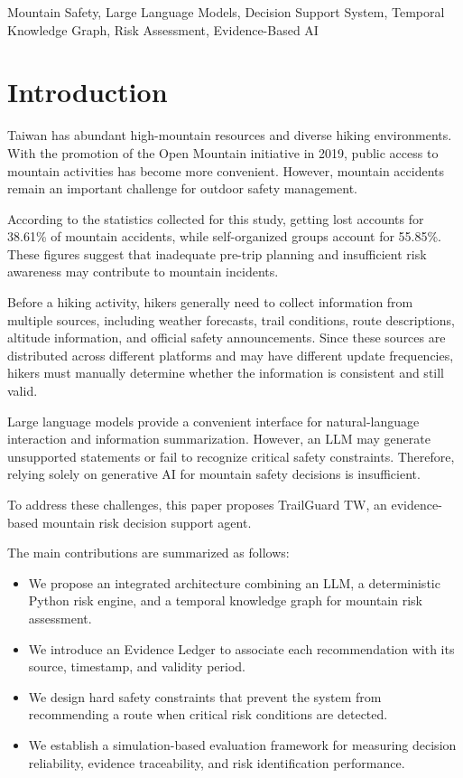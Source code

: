 \documentclass[conference]{IEEEtran}
\begin{document}
\begin{IEEEkeywords}
Mountain Safety, Large Language Models, Decision Support System,
Temporal Knowledge Graph, Risk Assessment, Evidence-Based AI
\end{IEEEkeywords}

\section{Introduction}

Taiwan has abundant high-mountain resources and diverse hiking
environments. With the promotion of the Open Mountain initiative
in 2019, public access to mountain activities has become more
convenient. However, mountain accidents remain an important
challenge for outdoor safety management.

According to the statistics collected for this study, getting lost
accounts for 38.61\% of mountain accidents, while self-organized
groups account for 55.85\%. These figures suggest that inadequate
pre-trip planning and insufficient risk awareness may contribute
to mountain incidents.

Before a hiking activity, hikers generally need to collect
information from multiple sources, including weather forecasts,
trail conditions, route descriptions, altitude information,
and official safety announcements. Since these sources are
distributed across different platforms and may have different
update frequencies, hikers must manually determine whether the
information is consistent and still valid.

Large language models provide a convenient interface for
natural-language interaction and information summarization.
However, an LLM may generate unsupported statements or fail to
recognize critical safety constraints. Therefore, relying solely
on generative AI for mountain safety decisions is insufficient.

To address these challenges, this paper proposes TrailGuard TW,
an evidence-based mountain risk decision support agent.

The main contributions are summarized as follows:

\begin{itemize}
    \item We propose an integrated architecture combining an LLM,
    a deterministic Python risk engine, and a temporal knowledge
    graph for mountain risk assessment.

    \item We introduce an Evidence Ledger to associate each
    recommendation with its source, timestamp, and validity period.

    \item We design hard safety constraints that prevent the
    system from recommending a route when critical risk conditions
    are detected.

    \item We establish a simulation-based evaluation framework
    for measuring decision reliability, evidence traceability,
    and risk identification performance.
\end{itemize}
\end{document}

